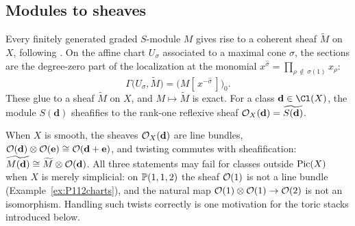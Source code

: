 \documentclass{amsart}
\begin{document}

\subsection{Modules to sheaves}\label{sec:module-sheaf}

Every finitely generated graded $S$-module $M$ gives rise to a coherent sheaf $\widetilde M$ on $X$, following \cite[\S5.3]{CLS2011}. On the affine chart $U_\sigma$ associated to a maximal cone $\sigma$, the sections are the degree-zero part of the localization at the monomial $x^{\widehat\sigma}=\prod_{\rho\,\notin\,\sigma(1)}x_\rho$:
\[ \Gamma\bigl(U_\sigma,\widetilde M\bigr)=\bigl(M[\,x^{-\widehat\sigma}\,]\bigr)_0. \]
These glue to a sheaf $\widetilde M$ on $X$, and $M\mapsto\widetilde M$ is exact. For a class $\mathbf d\in\Cl(X)$, the module $S(\mathbf d)$ sheafifies to the rank-one reflexive sheaf ${\mathcal O}_X(\mathbf d)=\widetilde{S(\mathbf d)}$.

\begin{remark}\label{rem:twistcaveat}
  When $X$ is smooth, the sheaves ${\mathcal O}_X(\mathbf d)$ are line bundles, ${\mathcal O}(\mathbf d)\otimes{\mathcal O}(\mathbf e)\cong{\mathcal O}(\mathbf d+\mathbf e)$, and twisting commutes with sheafification: $\widetilde{M(\mathbf d)}\cong\widetilde M\otimes{\mathcal O}(\mathbf d)$. All three statements may fail for classes outside $\operatorname{Pic}(X)$ when $X$ is merely simplicial: on $\mathbb P(1,1,2)$ the sheaf ${\mathcal O}(1)$ is not a line bundle (Example~\ref{ex:P112charts}), and the natural map ${\mathcal O}(1)\otimes{\mathcal O}(1)\to{\mathcal O}(2)$ is not an isomorphism. Handling such twists correctly is one motivation for the toric stacks introduced below.
\end{remark}
\end{document}
